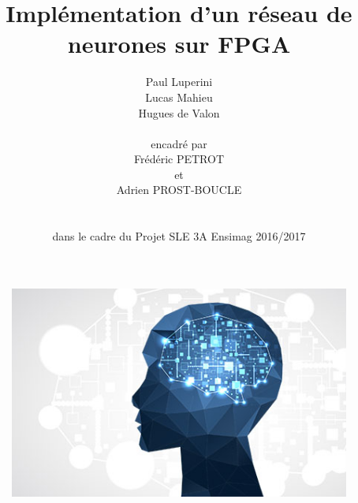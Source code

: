\documentclass[A4]{article}
\title{Implémentation d'un réseau de neurones sur FPGA}
\author{Paul Luperini\\ Lucas Mahieu\\Hugues de Valon\\   \\ encadré par\\ Frédéric PETROT\\ et\\ Adrien PROST-BOUCLE\\   \\   \\dans le cadre du Projet SLE 3A Ensimag 2016/2017}
\begin{document}
\maketitle

    \vspace{3cm}

\begin{figure}[h!]
    \centering
		\includegraphics[scale=0.8]{pagegarde}
    \label{fig:pagegarde}
\end{figure}

\pagebreak
\tableofcontents

\pagebreak

\end{document}
